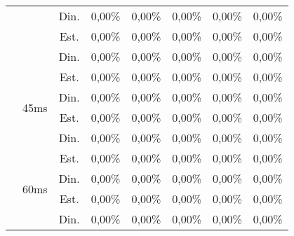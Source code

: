\begin{center}
\begin{longtable}{|c|c|c|ccccc|}
 &  & Din. & 0,00\% & 0,00\% & 0,00\% & 0,00\% & 0,00\% \\
 &  & Est. & 0,00\% & 0,00\% & 0,00\% & 0,00\% & 0,00\% \\
 &  & Din. & 0,00\% & 0,00\% & 0,00\% & 0,00\% & 0,00\% \\ \cline{2-8} 
 & \multirow{4}{*}{45ms} & Est. & 0,00\% & 0,00\% & 0,00\% & 0,00\% & 0,00\% \\
 &  & Din. & 0,00\% & 0,00\% & 0,00\% & 0,00\% & 0,00\% \\
 &  & Est. & 0,00\% & 0,00\% & 0,00\% & 0,00\% & 0,00\% \\
 &  & Din. & 0,00\% & 0,00\% & 0,00\% & 0,00\% & 0,00\% \\ \cline{2-8} 
 & \multirow{4}{*}{60ms} & Est. & 0,00\% & 0,00\% & 0,00\% & 0,00\% & 0,00\% \\
 &  & Din. & 0,00\% & 0,00\% & 0,00\% & 0,00\% & 0,00\% \\
 &  & Est. & 0,00\% & 0,00\% & 0,00\% & 0,00\% & 0,00\% \\
 &  & Din. & 0,00\% & 0,00\% & 0,00\% & 0,00\% & 0,00\% \\ \hline
\end{longtable}
\end{center}
